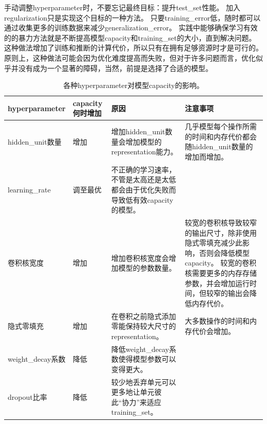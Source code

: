 手动调整\gls{hyperparameter}时，不要忘记最终目标：提升\gls{test_set}性能。
加入\gls{regularization}只是实现这个目标的一种方法。
只要\gls{training_error}低，随时都可以通过收集更多的训练数据来减少\gls{generalization_error}。
实践中能够确保学习有效的的暴力方法就是不断提高模型\gls{capacity}和\gls{training_set}的大小，直到解决问题。
这种做法增加了训练和推断的计算代价，所以只有在拥有足够资源时才是可行的。
原则上，这种做法可能会因为优化难度提高而失败，但对于许多问题而言，优化似乎并没有成为一个显著的障碍，当然，前提是选择了合适的模型。


\begin{table}
\centering
\small
\begin{tabular}{p{2.5cm}|p{1.5cm}|p{4.0cm}|p{4.0cm}}
\gls{hyperparameter} & \gls{capacity}何时增加 & 原因  & 注意事项 \\
\hline
\gls{hidden_unit}数量 &  增加          & 增加\gls{hidden_unit}数量会增加模型的\gls{representation}能力。 & 几乎模型每个操作所需的时间和内存代价都会随\gls{hidden_unit}数量的增加而增加。\\
\hline
\gls{learning_rate} & 调至最优 & 不正确的学习速率，不管是太高还是太低都会由于优化失败而导致低有效\gls{capacity}的模型。
 & \\
\hline
卷积核宽度 & 增加 & 增加卷积核宽度会增加模型的参数数量。&
较宽的卷积核导致较窄的输出尺寸，除非使用隐式零填充减少此影响，否则会降低模型\gls{capacity}。 
较宽的卷积核需要更多的内存存储参数，并会增加运行时间，但较窄的输出会降低内存代价。
\\
\hline
隐式零填充 & 增加 & 在卷积之前隐式添加零能保持较大尺寸的\gls{representation}。&
大多数操作的时间和内存代价会增加。\\
\hline
\gls{weight_decay}系数 & 降低 & 降低\gls{weight_decay}系数使得模型参数可以变得更大。
 & \\
\hline
\gls{dropout}比率 & 降低 & 较少地丢弃单元可以更多地让单元彼此``协力''来适应\gls{training_set}。
 & \\
\end{tabular}
\caption{各种\gls{hyperparameter}对模型\gls{capacity}的影响。}
\label{tab:hyperparameter_effect}
\end{table}




